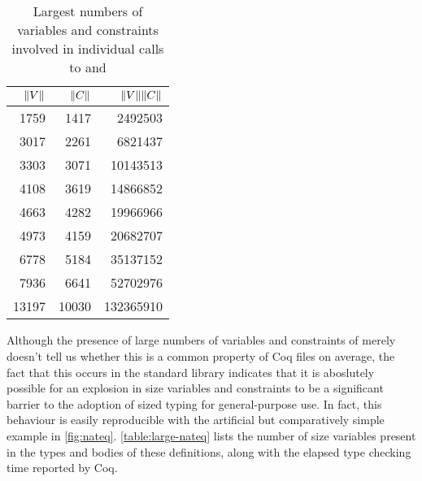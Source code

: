 \begin{table}
\centering
\begin{tabular}{|r | r | r |}
\hline
\textbf{$\lVert V\rVert$} & \textbf{$\lVert C\rVert$} & \textbf{$\lVert V\rVert\lVert C\rVert$} \\
\hline
 1759 &  1417 &   2492503 \\
 3017 &  2261 &   6821437 \\
 3303 &  3071 &  10143513 \\
 4108 &  3619 &  14866852 \\
 4663 &  4282 &  19966966 \\
 4973 &  4159 &  20682707 \\
 6778 &  5184 &  35137152 \\
 7936 &  6641 &  52702976 \\
13197 & 10030 & 132365910 \\
\hline
\end{tabular}
\caption{Largest numbers of variables and constraints involved in individual calls to \solve and \RecCheck}
\label{table:large-vcs}
\end{table}

Although the presence of large numbers of variables and constraints of merely \fieldtheorysized doesn't tell us whether this is a common property of Coq files on average,
the fact that this occurs in the standard library indicates that it is aboslutely possible for an explosion in size variables and constraints to be a significant barrier to the adoption of sized typing for general-purpose use.
In fact, this behaviour is easily reproducible with the artificial but comparatively simple example in \autoref{fig:nateq}.
\autoref{table:large-nateq} lists the number of size variables present in the types and bodies of these definitions,
along with the elapsed type checking time reported by Coq.

